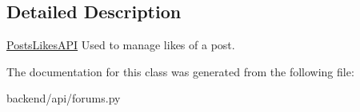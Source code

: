 \subsection{Detailed Description}
\hyperlink{classbackend_1_1api_1_1forums_1_1_posts_likes_a_p_i}{Posts\+Likes\+A\+P\+I} Used to manage likes of a post. 

The documentation for this class was generated from the following file\+:\begin{DoxyCompactItemize}
\item 
backend/api/forums.\+py\end{DoxyCompactItemize}
